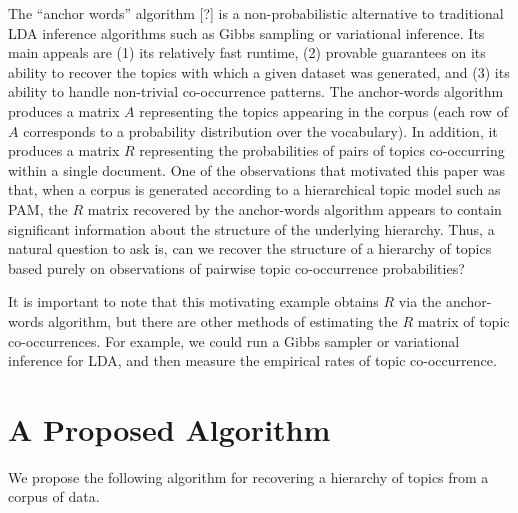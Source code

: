 \documentclass{article}
\theoremstyle{definition}
\newcommand{\tocite}{[?]}
\begin{document}
The ``anchor words'' algorithm \tocite{} is a non-probabilistic alternative to traditional LDA inference algorithms such as Gibbs sampling or variational inference.
Its main appeals are (1) its relatively fast runtime, (2) provable guarantees on its ability to recover the topics with which a given dataset was generated, and (3) its ability to handle non-trivial co-occurrence patterns.
The anchor-words algorithm produces a matrix $A$ representing the topics appearing in the corpus (each row of $A$ corresponds to a probability distribution over the vocabulary).
In addition, it produces a matrix $R$ representing the probabilities of pairs of topics co-occurring within a single document.
One of the observations that motivated this paper was that, when a corpus is generated according to a hierarchical topic model such as PAM, the $R$ matrix recovered by the anchor-words algorithm appears to contain significant information about the structure of the underlying hierarchy.
Thus, a natural question to ask is, can we recover the structure of a hierarchy of topics based purely on observations of pairwise topic co-occurrence probabilities?

It is important to note that this motivating example obtains $R$ via the anchor-words algorithm, but there are other methods of estimating the $R$ matrix of topic co-occurrences.
For example, we could run a Gibbs sampler or variational inference for LDA, and then measure the empirical rates of topic co-occurrence.

\section{A Proposed Algorithm}

We propose the following algorithm for recovering a hierarchy of topics from a corpus of data.

\newcommand{\Rbar}{\overline{R}}
\end{document}
